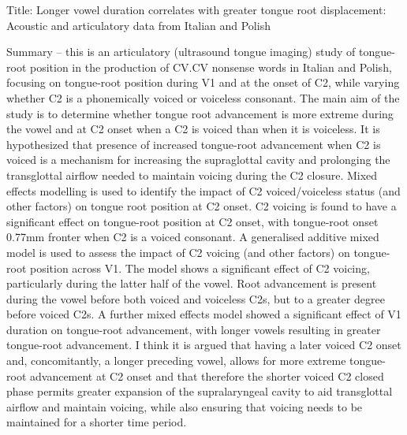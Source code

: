 \documentclass[]{article}
\begin{document}
Title: Longer vowel duration correlates with greater tongue root
displacement: Acoustic and articulatory data from Italian and Polish

Summary -- this is an articulatory (ultrasound tongue imaging) study of
tongue-root position in the production of CV.CV nonsense words in
Italian and Polish, focusing on tongue-root position during V1 and at
the onset of C2, while varying whether C2 is a phonemically voiced or
voiceless consonant. The main aim of the study is to determine whether
tongue root advancement is more extreme during the vowel and at C2 onset
when a C2 is voiced than when it is voiceless. It is hypothesized that
presence of increased tongue-root advancement when C2 is voiced is a
mechanism for increasing the supraglottal cavity and prolonging the
transglottal airflow needed to maintain voicing during the C2 closure.
Mixed effects modelling is used to identify the impact of C2
voiced/voiceless status (and other factors) on tongue root position at
C2 onset. C2 voicing is found to have a significant effect on
tongue-root position at C2 onset, with tongue-root onset 0.77mm fronter
when C2 is a voiced consonant. A generalised additive mixed model is
used to assess the impact of C2 voicing (and other factors) on
tongue-root position across V1. The model shows a significant effect of
C2 voicing, particularly during the latter half of the vowel. Root
advancement is present during the vowel before both voiced and voiceless
C2s, but to a greater degree before voiced C2s. A further mixed effects
model showed a significant effect of V1 duration on tongue-root
advancement, with longer vowels resulting in greater tongue-root
advancement. I think it is argued that having a later voiced C2 onset
and, concomitantly, a longer preceding vowel, allows for more extreme
tongue-root advancement at C2 onset and that therefore the shorter
voiced C2 closed phase permits greater expansion of the supralaryngeal
cavity to aid transglottal airflow and maintain voicing, while also
ensuring that voicing needs to be maintained for a shorter time period.
\end{document}
